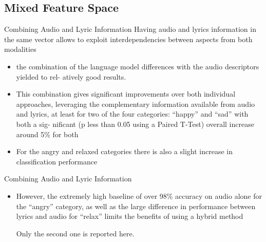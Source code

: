 \documentclass{beamer}
\begin{document}
\subsection{Mixed Feature Space}

\begin{frame}{Combining Audio and Lyric Information}
Having audio and lyrics information in the same vector allows to exploit interdependencies between aspects from both modalities

\begin{itemize}
\item
{
	the combination of the language
model differences with the audio descriptors yielded to rel-
atively good results.
	
}
\item
{
	This combination gives significant improvements over both individual approaches, leveraging the complementary information available from audio and lyrics, at least for two of the four categories: “happy” and “sad” with both a sig- nificant (p less than 0.05 using a Paired T-Test) overall increase around 5\% for both
	
}
\item
{
	For the angry and relaxed categories
there is also a slight increase in classification performance
	
	
}
\end{itemize}
\end{frame}
\begin{frame}{Combining Audio and Lyric Information}
\begin{itemize}
\item
{
	However, the extremely high baseline of over 98\% accuracy on audio alone for the “angry” category, as well as the large difference in performance between lyrics and audio for “relax” limits the benefits of using a hybrid method

}

Only the second one is reported here.
\end{itemize}

\end{frame}
\end{document}
